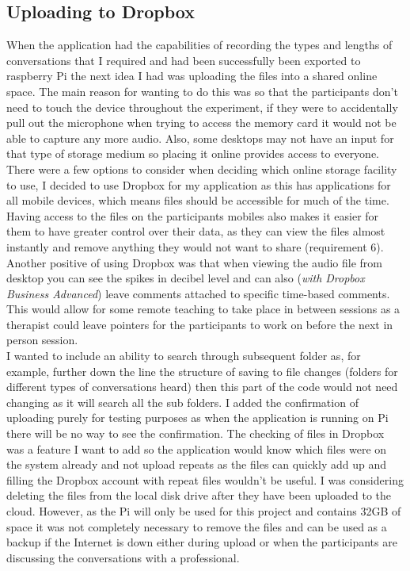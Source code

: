\documentclass[a4paper,11pt]{report}
\begin{document}
\subsection{Uploading to Dropbox}
When the application had the capabilities of recording the types and lengths of conversations that I required and had been successfully been exported to raspberry Pi the next idea I had was uploading the files into a shared online space. The main reason for wanting to do this was so that the participants don’t need to touch the device throughout the experiment, if they were to accidentally pull out the microphone when trying to access the memory card it would not be able to capture any more audio. Also, some desktops may not have an input for that type of storage medium so placing it online provides access to everyone. There were a few options to consider  when deciding which online storage facility to use, I decided to use Dropbox for my application as this has applications for all mobile devices, which means files should be accessible for much of the time. Having access to the files on the participants mobiles also makes it easier for them to have greater control over their data, as they can view the files almost instantly and remove anything they would not want to share (requirement 6). Another positive of using Dropbox was that when viewing the audio file from desktop you can see the spikes in decibel level and can also (\textit{with Dropbox Business Advanced}) leave comments attached to specific time-based comments. This would allow for some remote teaching to take place in between sessions as a therapist could leave pointers for the participants to work on before the next in person session.\\

I wanted to include an ability to search through subsequent folder as, for example, further down the line the structure of saving to file changes (folders for different types of conversations heard) then this part of the code would not need changing as it will search all the sub folders. I added the confirmation of uploading purely for testing purposes as when the application is running on Pi there will be no way to see the confirmation. The checking of files in Dropbox was a feature I want to add so the application would know which files were on the system already and not upload repeats as the files can quickly add up and filling the Dropbox account with repeat files wouldn’t be useful. I was considering deleting the files from the local disk drive after they have been uploaded to the cloud. However, as the Pi will only be used for this project and contains 32GB of space it was not completely necessary to remove the files and can be used as a backup if the Internet is down either during upload or when the participants are discussing the conversations with a professional.\\
\end{document}
